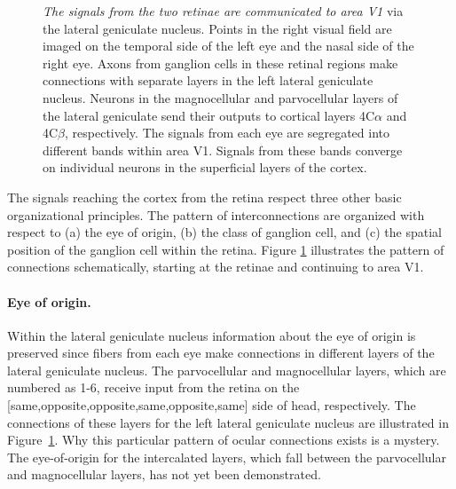 \begin{figure}
\centerline{
}
\caption[Inputs to area V1]{
{\em The signals from the two retinae are communicated to area V1}
via the lateral geniculate nucleus.
Points in the right visual field are imaged on the temporal
side of the left eye and the nasal side of the right eye.
Axons from ganglion cells in these retinal regions
make connections with separate
layers in the left lateral geniculate nucleus.
Neurons in the magnocellular and parvocellular
layers of the lateral geniculate send their outputs
to cortical layers 4C$\alpha$ and 4C$\beta$, respectively.
The signals from each eye are segregated into different
bands within area V1.
Signals from these bands converge on individual neurons in
the superficial layers of the cortex.
}
\label{f5:cortexInput}
\end{figure}

The signals reaching the cortex from the retina respect three other
basic organizational principles.  The pattern of interconnections are
organized with respect to (a) the eye of origin, (b) the class of
ganglion cell, and (c) the spatial position of the ganglion cell
within the retina.  Figure \ref{f5:cortexInput} illustrates the
pattern of connections schematically, 
starting at the retinae and continuing to area V1.

\paragraph{Eye of origin.  }
Within the lateral geniculate nucleus information about
the eye of origin is preserved since fibers from each
eye make connections in different layers of the lateral
geniculate nucleus.
The parvocellular and magnocellular
layers, which are numbered as 1-6,
receive input from the retina on the
[same,opposite,opposite,same,opposite,same] side of head,
respectively.
The connections of these layers for
the left lateral geniculate nucleus are illustrated in
Figure~\ref{f5:cortexInput}.
Why this particular pattern of ocular connections
exists is a mystery.
The eye-of-origin for the
intercalated layers, which fall between the
parvocellular and magnocellular layers,
has not yet been demonstrated.

